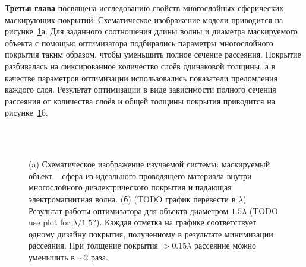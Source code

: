 \underline{\textbf{Третья глава}} посвящена исследованию свойств
многослойных сферических маскирующих покрытий. Схематическое
изображение модели приводится на рисунке~\ref{img:scattering}а. Для
заданного соотношения длины волны и диаметра маскируемого объекта с
помощью оптимизатора подбирались параметры многослойного покрытия
таким образом, чтобы уменьшить полное сечение рассеяния.  Покрытие
разбивалась на фиксированное количество слоёв одинаковой толщины, а в
качестве параметров оптимизации использовались показатели преломления
каждого слоя.  Результат оптимизации в виде зависимости полного
сечения рассеяния от количества слоёв и общей толщины покрытия
приводится на рисунке~\ref{img:scattering}б.
\begin{figure}[t]
  \begin{minipage}[ht]{0.45\linewidth}        
  \end{minipage}
  \hfill
  \begin{minipage}[ht]{0.54\linewidth}
  \end{minipage}\\
  \vspace{0.3em}\\
  \begin{minipage}[ht]{0.45\linewidth}        
  \end{minipage}
  \hfill
  \begin{minipage}[ht]{0.54\linewidth}
  \end{minipage}

  \caption{(a) Схематическое изображение изучаемой системы: маскируемый
    объект -- сфера из идеального проводящего материала внутри
    многослойного диэлектрического покрытия и падающая
    электромагнитная волна. (б) (TODO график перевести в $\lambda$)
    Результат работы оптимизатора для объекта диаметром $1.5\lambda$
    (TODO use plot for $\lambda/1.5$?).  Каждая отметка на графике
    соответствует одному дизайну покрытия, полученному в результате
    минимизации рассеяния. При толщение покрытия
    $>0.15\lambda$ рассеяние можно уменьшить в $\sim 2$
    раза.}
  \label{img:scattering}  
\end{figure}
